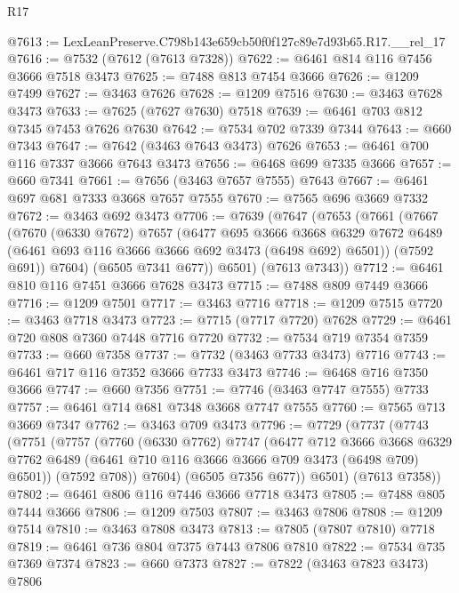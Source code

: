 \begin{lexlean}{R17}
\begin{coremodule}
@7613 := LexLeanPreserve.C798b143e659cb50f0f127c89e7d93b65.R17.__rel_17
@7616 := @7532 (@7612 (@7613 @7328))
@7622 := @6461 @814 @116 @7456 @3666 @7518 @3473
@7625 := @7488 @813 @7454 @3666
@7626 := @1209 @7499
@7627 := @3463 @7626
@7628 := @1209 @7516
@7630 := @3463 @7628 @3473
@7633 := @7625 (@7627 @7630) @7518
@7639 := @6461 @703 @812 @7345 @7453 @7626 @7630
@7642 := @7534 @702 @7339 @7344
@7643 := @660 @7343
@7647 := @7642 (@3463 @7643 @3473) @7626
@7653 := @6461 @700 @116 @7337 @3666 @7643 @3473
@7656 := @6468 @699 @7335 @3666
@7657 := @660 @7341
@7661 := @7656 (@3463 @7657 @7555) @7643
@7667 := @6461 @697 @681 @7333 @3668 @7657 @7555
@7670 := @7565 @696 @3669 @7332
@7672 := @3463 @692 @3473
@7706 := @7639
    (@7647
      (@7653
        (@7661
          (@7667
            (@7670
              (@6330 @7672)
              @7657
              (@6477
                @695
                @3666
                @3668
                @6329
                @7672
                @6489
                (@6461 @693 @116 @3666 @3666 @692 @3473 (@6498 @692) @6501))
              (@7592 @691))
            @7604)
          (@6505 @7341 @677))
        @6501)
      (@7613 @7343))
@7712 := @6461 @810 @116 @7451 @3666 @7628 @3473
@7715 := @7488 @809 @7449 @3666
@7716 := @1209 @7501
@7717 := @3463 @7716
@7718 := @1209 @7515
@7720 := @3463 @7718 @3473
@7723 := @7715 (@7717 @7720) @7628
@7729 := @6461 @720 @808 @7360 @7448 @7716 @7720
@7732 := @7534 @719 @7354 @7359
@7733 := @660 @7358
@7737 := @7732 (@3463 @7733 @3473) @7716
@7743 := @6461 @717 @116 @7352 @3666 @7733 @3473
@7746 := @6468 @716 @7350 @3666
@7747 := @660 @7356
@7751 := @7746 (@3463 @7747 @7555) @7733
@7757 := @6461 @714 @681 @7348 @3668 @7747 @7555
@7760 := @7565 @713 @3669 @7347
@7762 := @3463 @709 @3473
@7796 := @7729
    (@7737
      (@7743
        (@7751
          (@7757
            (@7760
              (@6330 @7762)
              @7747
              (@6477
                @712
                @3666
                @3668
                @6329
                @7762
                @6489
                (@6461 @710 @116 @3666 @3666 @709 @3473 (@6498 @709) @6501))
              (@7592 @708))
            @7604)
          (@6505 @7356 @677))
        @6501)
      (@7613 @7358))
@7802 := @6461 @806 @116 @7446 @3666 @7718 @3473
@7805 := @7488 @805 @7444 @3666
@7806 := @1209 @7503
@7807 := @3463 @7806
@7808 := @1209 @7514
@7810 := @3463 @7808 @3473
@7813 := @7805 (@7807 @7810) @7718
@7819 := @6461 @736 @804 @7375 @7443 @7806 @7810
@7822 := @7534 @735 @7369 @7374
@7823 := @660 @7373
@7827 := @7822 (@3463 @7823 @3473) @7806

\end{coremodule}
\end{lexlean}
